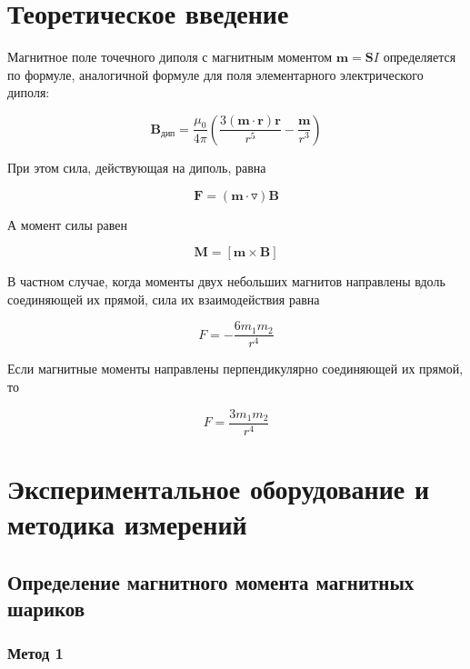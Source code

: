 \documentclass[a4paper, 12pt]{article}%
\begin{document}
\section{Теоретическое введение}

Магнитное поле точечного диполя с магнитным моментом $\textbf{m} = \textbf{S}I$ определяется по формуле, аналогичной формуле для поля элементарного электрического диполя:

\begin{equation}
    \textbf{B}_{\text{дип}} = \frac{\mu_0}{4 \pi} \left( \frac{3(\textbf{m} \cdot \textbf{r})\textbf{r}}{r^5} - \frac{\textbf{m}}{r^3}  \right)
\end{equation}

При этом сила, действующая на диполь, равна

\begin{equation}
    \textbf{F} = (\textbf{m} \cdot \triangledown ) \textbf{B}
\end{equation}

А момент силы равен

\begin{equation}
    \textbf{M} = [ \textbf{m} \times \textbf{B}]
\end{equation}

В частном случае, когда моменты двух небольших магнитов направлены вдоль соединяющей их прямой, сила их взаимодействия равна

\begin{equation}
    F = - \frac{6 m_1 m_2}{r^4}
\end{equation}

Если магнитные моменты направлены перпендикулярно соединяющей их прямой, то

\begin{equation}
    F = \frac{3 m_1 m_2}{r^4}
\end{equation}

\section{Экспериментальное оборудование и методика измерений}

\subsection{Определение магнитного момента магнитных шариков}

\subsubsection{Метод 1}
\end{document}
